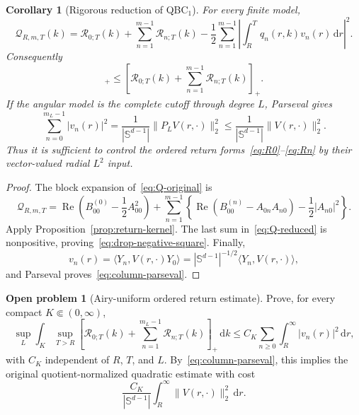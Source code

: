 \documentclass[11pt]{article}
\newcommand{\dd}{\,\mathrm d}
\newcommand{\Sd}{\mathbb S^{d-1}}
\newcommand{\cQ}{\mathcal Q}
\newcommand{\cR}{\mathcal R}
\DeclareMathOperator{\Rea}{Re}
\newtheorem{corollary}[proposition]{Corollary}
\theoremstyle{definition}
\newtheorem{problem}[proposition]{Open problem}
\begin{document}
\begin{corollary}[Rigorous reduction of QBC$_1$]
\label{cor:reduced-qbc}
For every finite model,
\begin{equation}
 \cQ_{R,m,T}(k)
 =\cR_{0;T}(k)+\sum_{n=1}^{m-1}\cR_{n;T}(k)
 -\frac12\sum_{n=1}^{m-1}
 \left|\int_R^Tq_n(r,k)v_n(r)\dd r\right|^2.
 \label{eq:Q-reduced}
\end{equation}
Consequently
\begin{equation}
 [\cQ_{R,m,T}(k)]_+
 \leq
 \left[\cR_{0;T}(k)+\sum_{n=1}^{m-1}\cR_{n;T}(k)\right]_+.
 \label{eq:drop-negative-square}
\end{equation}
If the angular model is the complete cutoff through degree $L$, Parseval gives
\begin{equation}
 \sum_{n=0}^{m_L-1}|v_n(r)|^2
 =\frac1{|\Sd|}\|P_LV(r,\cdot)\|_2^2
 \leq\frac1{|\Sd|}\|V(r,\cdot)\|_2^2.
 \label{eq:column-parseval}
\end{equation}
Thus it is sufficient to control the ordered return forms~\eqref{eq:R0}--\eqref{eq:Rn} by their vector-valued radial $L^2$ input.
\end{corollary}

\begin{proof}
The block expansion of~\eqref{eq:Q-original} is
\begin{equation}
 \cQ_{R,m,T}
 =\Rea\left(B_{00}^{(0)}-\frac12A_{00}^2\right)
 +\sum_{n=1}^{m-1}
 \left\{\Rea(B_{00}^{(n)}-A_{0n}A_{n0})-\frac12|A_{n0}|^2\right\}.
\end{equation}
Apply Proposition~\ref{prop:return-kernel}.  The last sum in~\eqref{eq:Q-reduced} is nonpositive, proving~\eqref{eq:drop-negative-square}.  Finally,
\begin{equation}
 v_n(r)=\langle Y_n,V(r,\cdot)Y_0\rangle
 =|\Sd|^{-1/2}\langle Y_n,V(r,\cdot)\rangle,
\end{equation}
and Parseval proves~\eqref{eq:column-parseval}.
\end{proof}

\begin{problem}[Airy-uniform ordered return estimate]
\label{prob:airy-qbc}
Prove, for every compact $K\Subset(0,\infty)$,
\begin{equation}
 \sup_L\int_K\sup_{T>R}
 \left[\cR_{0;T}(k)+\sum_{n=1}^{m_L-1}\cR_{n;T}(k)\right]_+\dd k
 \leq C_K\sum_{n\geq0}\int_R^\infty|v_n(r)|^2\dd r,
 \label{eq:reduced-QBC}
\end{equation}
with $C_K$ independent of $R$, $T$, and $L$.  By~\eqref{eq:column-parseval}, this implies the original quotient-normalized quadratic estimate with cost
\begin{equation}
 \frac{C_K}{|\Sd|}\int_R^\infty\|V(r,\cdot)\|_2^2\dd r.
\end{equation}
\end{problem}
\end{document}
